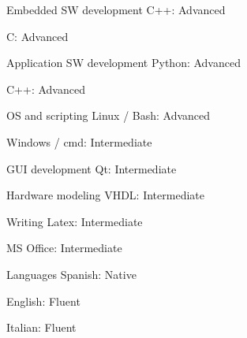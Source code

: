

\begin{cvskills}

    \cvskill
    {Embedded SW development} %
    {C++: Advanced}

    \cvskill
    {}
    {C: Advanced}

    \cvskill
    {Application SW development}
    {Python: Advanced}

    \cvskill
    {}
    {C++: Advanced}

    \cvskill
    {OS and scripting}
    {Linux / Bash: Advanced}

    \cvskill
    {}
    {Windows / cmd: Intermediate}

    \cvskill
    {GUI development}
    {Qt: Intermediate}

    \cvskill
    {Hardware modeling}
    {VHDL: Intermediate}

    \cvskill
    {Writing}
    {Latex: Intermediate}

    \cvskill
    {}
    {MS Office: Intermediate}

    \cvskill
    {Languages}
    {Spanish: Native}

    \cvskill
    {}
    {English: Fluent}

    \cvskill
    {}
    {Italian: Fluent}

\end{cvskills}
